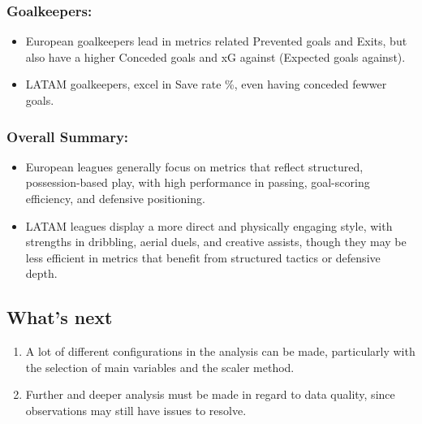 \documentclass[11pt]{article}
\providecommand{\tightlist}{%
      \setlength{\itemsep}{0pt}\setlength{\parskip}{0pt}}
\begin{document}
\subsubsection{Goalkeepers:}\label{goalkeepers}

\begin{itemize}
\tightlist
\item
  European goalkeepers lead in metrics related Prevented goals and
  Exits, but also have a higher Conceded goals and xG against (Expected
  goals against).
\item
  LATAM goalkeepers, excel in Save rate \%, even having conceded fewwer
  goals.
\end{itemize}

\subsubsection{Overall Summary:}\label{overall-summary}

\begin{itemize}
\tightlist
\item
  European leagues generally focus on metrics that reflect structured,
  possession-based play, with high performance in passing, goal-scoring
  efficiency, and defensive positioning.
\item
  LATAM leagues display a more direct and physically engaging style,
  with strengths in dribbling, aerial duels, and creative assists,
  though they may be less efficient in metrics that benefit from
  structured tactics or defensive depth.
\end{itemize}

    \subsection{What's next}\label{whats-next}

    \begin{enumerate}
\def\labelenumi{\arabic{enumi}.}
\tightlist
\item
  A lot of different configurations in the analysis can be made,
  particularly with the selection of main variables and the scaler
  method.
\item
  Further and deeper analysis must be made in regard to data quality,
  since observations may still have issues to resolve.
\end{enumerate}


    
    
    
\end{document}
